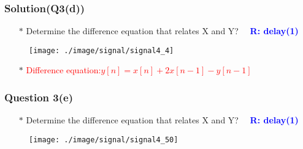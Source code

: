 \documentclass{beamer}
\newcommand{\blue}[1]{\textcolor{blue}{#1}}
\newcommand{\red}[1]{\textcolor{red}{#1}}
\begin{document}
\begin{frame}
\frametitle{Solution(Q3(d))}

\begin{itemize} \itemsep1pt \parskip0pt 
  \item[$\ast$] Determine the difference equation that relates X and Y?  ~~\blue{\bf R: delay(1)}
\end{itemize}



\begin{figure}[H]
  \centering
  \texttt{[image: ./image/signal/signal4\_4]}
\end{figure}

\begin{itemize} \itemsep1pt \parskip0pt 
  \item[$\ast$] \red{Difference equation:$y[n] = x[n] + 2x[n-1] - y[n-1]$}
\end{itemize}

\end{frame}


\begin{frame}
\frametitle{Question 3(e)}

\begin{itemize} \itemsep1pt \parskip0pt 
  \item[$\ast$] Determine the difference equation that relates X and Y?  ~~\blue{\bf R: delay(1)}
\end{itemize}
\vspace{10 mm}


\begin{figure}[H]
  \centering
  \texttt{[image: ./image/signal/signal4\_50]}
\end{figure}


\end{frame}

\end{document}
